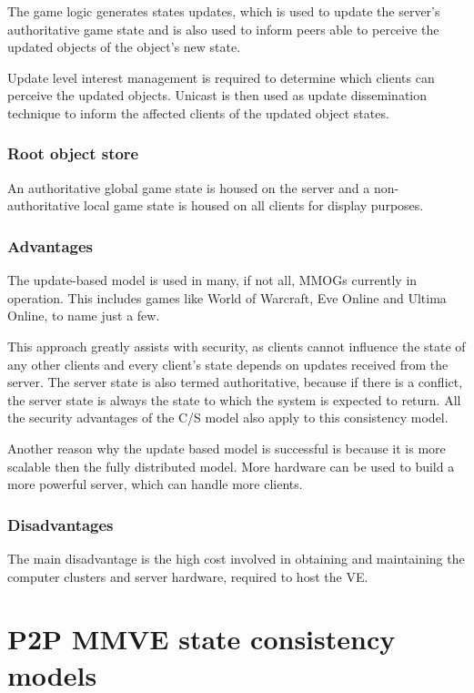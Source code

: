 The game logic generates states updates, which is used to update the server's authoritative game state and is also used to inform peers able to perceive the updated objects of the object's new state.

Update level interest management is required to determine which clients can perceive the updated objects. Unicast is then used as update dissemination technique to inform the affected clients of the updated object states.

\subsubsection{Root object store}
An authoritative global game state is housed on the server and a  non-authoritative local game state is housed on all clients for display purposes.

\subsubsection{Advantages}
The update-based model is used in many, if not all, MMOGs currently in operation. This includes games like World of Warcraft, Eve Online and Ultima Online, to name just a few.

This approach greatly assists with security, as clients cannot influence the state of any other clients and every client's state depends on updates
received from the server. The server state is also termed authoritative, because if there is a conflict, the server state is always the state to
which the system is expected to return. All the security advantages of the C/S model also apply to this consistency model.

Another reason why the update based model is successful is because it is more scalable then the fully distributed model. More hardware can be used to build a more powerful server, which can handle more clients.

\subsubsection{Disadvantages}

The main disadvantage is the high cost involved in obtaining and maintaining the computer clusters and server hardware, required to host the VE.

\section{P2P MMVE state consistency models}


